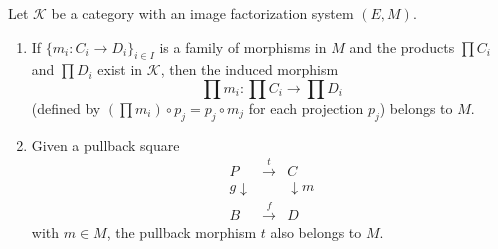 Let $\mathcal{K}$ be a category with an image factorization system $(E, M)$.

\begin{enumerate}
\item If $\{m_i: C_i \longrightarrow D_i\}_{i \in I}$ is a family of morphisms in $M$ and the products $\prod C_i$ and $\prod D_i$ exist in $\mathcal{K}$, then the induced morphism
$$
\prod m_i: \prod C_i \longrightarrow \prod D_i
$$
(defined by $(\prod m_i) \circ p_j = p_j \circ m_j$ for each projection $p_j$) belongs to $M$.

\item Given a pullback square
$$
\begin{array}{ccc}
P & \xrightarrow{t} & C \\
{\scriptstyle g}\downarrow & & \downarrow{\scriptstyle m} \\
B & \xrightarrow{f} & D
\end{array}
$$
with $m \in M$, the pullback morphism $t$ also belongs to $M$.
\end{enumerate}
